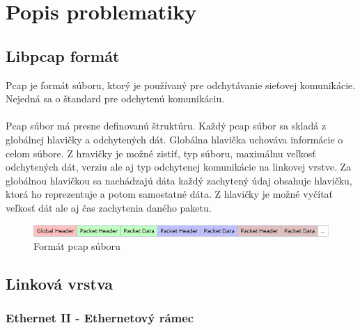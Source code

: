 \documentclass[10pt,a4paper,final]{article}
\begin{document}
\newpage
\section{Popis problematiky}
\subsection{Libpcap formát}

Pcap je formát súboru, ktorý je používaný pre odchytávanie sieťovej komunikácie. Nejedná sa o štandard pre odchytenú komunikáciu\cite{pcapformat}.
\\\\
Pcap súbor má presne definovanú štruktúru. Každý pcap súbor sa skladá z globálnej hlavičky a odchytených dát. Globálna hlavička uchováva informácie o celom súbore. Z hravičky je možné zistiť, typ súboru, maximálnu veľkosť odchytených dát, verziu ale aj typ odchytenej komunikácie na linkovej vrstve. Za globálnou hlavičkou sa nachádzajú dáta každý zachytený údaj obsahuje hlavičku, ktorá ho reprezentuje a potom samostatné dáta. Z hlavičky je možné vyčítať veľkosť dát  ale aj čas zachytenia daného paketu. 

\begin{figure}[H]
	\centering
	\includegraphics[scale=0.665, keepaspectratio]{images/pcap.eps}
	\caption{Formát pcap súboru\cite{pcapformat}}
\end{figure}

\subsection{Linková vrstva}
\subsubsection{Ethernet II - Ethernetový rámec}
\end{document}
